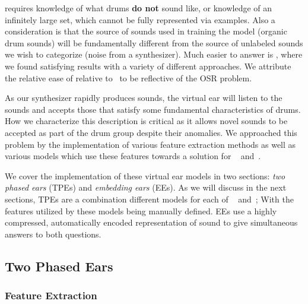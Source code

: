 \documentclass[\main/thesis.tex]{subfiles}
\begin{document}
 requires knowledge of what drums \textbf{do not} sound like, or knowledge of an infinitely large set, which cannot be fully represented via examples. Also a consideration is that the source of sounds used in training the model (organic drum sounds) will be fundamentally different from the source of unlabeled sounds we wish to categorize (noise from a synthesizer). Much easier to answer is , where we found satisfying results with a variety of different approaches. We attribute the relative ease of  relative to~ to be reflective of the OSR problem. 



As our synthesizer rapidly produces sounds, the virtual ear will listen to the sounds and accepts those that satisfy some fundamental characteristics of drums. How we characterize this description is critical as it allows novel sounds to be accepted as part of the drum group despite their anomalies. We approached this problem by the implementation of various feature extraction methods as well as various models which use these features towards a solution for ~ and~.

We cover the implementation of these virtual ear models in two sections: \emph{two phased ears} (TPEs) and \emph{embedding ears} (EEs). As we will discuss in the next sections, TPEs are a combination different models for each of ~ and~; With the features utilized by these models being manually defined. EEs use a highly compressed, automatically encoded representation of sound to give simultaneous answers to both questions.

\subsection{Two Phased Ears}
\label{sec:ear}
\subsubsection{Feature Extraction}
\end{document}
